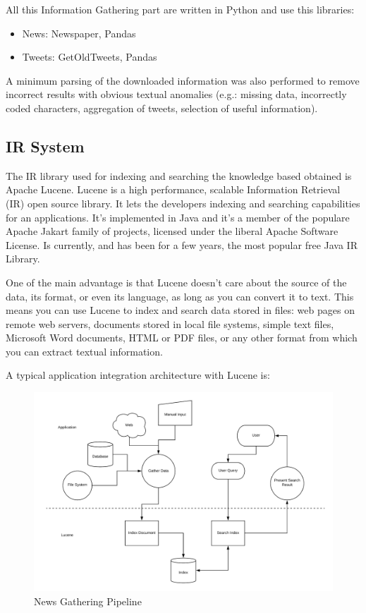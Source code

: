 \documentclass[11pt, english]{article}
\begin{document}
All this Information Gathering part are written in Python and use this libraries:
\begin{itemize}
\item News: Newspaper, Pandas
\item Tweets: GetOldTweets, Pandas
\end{itemize}

A minimum parsing of the downloaded information was also performed to remove incorrect results with obvious textual anomalies (e.g.: missing data, incorrectly coded characters, aggregation of tweets, selection of useful information).



\newpage

\subsection{IR System}

The IR library used for indexing and searching the knowledge based obtained is Apache Lucene.
Lucene is a high performance, scalable Information Retrieval (IR) open source library. It lets the developers indexing and searching capabilities for an applications.
It's implemented in Java and it's a member of the populare Apache Jakart family of projects, licensed under the liberal Apache Software License.
Is currently, and has been for a few years, the most popular free Java IR Library.

One of the main advantage is that Lucene doesn't care about the source of the data, its format, or even its language, as long as you can convert it to text. This means you can use Lucene to index and search data stored in files: web pages on remote web servers, documents stored in local file systems, simple text files, Microsoft Word documents, HTML or PDF files, or any other format from which you can extract textual information.

A typical application integration architecture with Lucene is:

\begin{figure}[H]
  \includegraphics[width=16cm]{Resources/IRLuceneArchitecture.png}
  \caption{News Gathering Pipeline} 
\end{figure}
\end{document}
